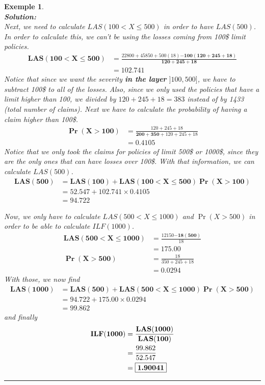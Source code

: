 \documentclass[11pt, english]{memoir}
\numberwithin{definition}{section}
\newtheorem{example}{Exemple}[section]
\newenvironment{exemple}
{
	\begin{example} \normalfont \ \\[5pt] 
	}
	{
		\hfill\rule{0.5em}{0.5em}\end{example}
}
\newenvironment{solution}
{\noindent\textbf{Solution:} \\[5pt] 
}{
}
\begin{document}
\begin{exemple}
\begin{solution}
		Next, we need to calculate $ LAS(100 < X \leq 500) $ in order to have $ LAS(500) $. In order to calculate this, we can't be using the losses coming from 100\$ limit policies. 
		\begin{align*}
		\mathbf{LAS(100 < X \leq 500)} 	&= \frac{22800 + 45850 + 500(18) \mathbf{- 100(120 + 245 + 18)}}{\mathbf{120 + 245 + 18}}\\
								&= 102.741
		\end{align*}
		Notice that since we want the severity \textbf{in the layer} $ ]100, 500] $, we have to subtract 100\$ to all of the losses. Also, since we only used the policies that have a limit higher than 100, we divided by $ 120 + 245 + 18 = 383 $ instead of by 1433 (total number of claims). Next we have to calculate the probability of having a claim higher than 100\$. 
		\begin{align*}
		\mathbf{\Pr(X > 100)} 	&= \frac{120 + 245 + 18}{\mathbf{200 + 350} + 120 + 245 + 18}\\
								&=0.4105
		\end{align*}
		Notice that we only took the claims for policies of limit 500\$ or 1000\$, since they are the only ones that can have losses over 100\$. With that information, we can calculate $ LAS(500) $.
		\begin{align*}
		\mathbf{LAS(500)} 	&= \mathbf{LAS(100) + LAS(100 < X \leq 500) \Pr(X > 100)}\\
							&=52.547 + 102.741 \times 0.4105\\
							&= 94.722
		\end{align*}
		
		Now, we only have to calculate $  LAS(500 < X \leq 1000) $ and  $\Pr(X > 500) $ in order to be able to calculate $ ILF(1000) $.
		\begin{align*}
		 \mathbf{LAS(500 < X \leq 1000)} &= \frac{12150 \mathbf{- 18(500)}}{18}\\
		 						&= 175.00\\[10pt] 
		 \mathbf{\Pr(X > 500)} 	&= \frac{18}{350 + 245 + 18}\\
		 				&= 0.0294
		\end{align*}
		With those, we now find
		\begin{align*}
		\mathbf{LAS(1000)} 	&= \mathbf{LAS(500) +  LAS(500 < X \leq 1000) \Pr(X > 500)}\\
					&= 94.722 + 175.00\times 0.0294\\
					&= 99.862
		\end{align*}
		and finally 
		\begin{align*}
		\mathbf{ILF(1000)} 	&= \mathbf{\frac{LAS(1000)}{LAS(100)}}\\
					&= \frac{99.862}{52.547}\\
					&= \fbox{\textbf{1.90041}}
		\end{align*}
	\end{solution}
\end{exemple}
\end{document}
